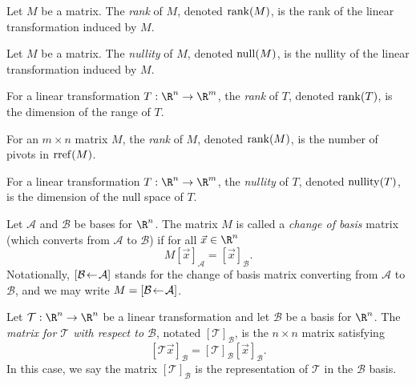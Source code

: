 \begin{SaveDefinition}[key=RankofaMatrix, title={Rank of a Matrix}]
	Let $M$ be a matrix.
	The \emph{rank} of $M$, denoted $\Rank(M)$, is the rank of
	the linear transformation induced by $M$.
\end{SaveDefinition}

\begin{SaveDefinition}[key=NullityofaMatrix, title={Nullity of a Matrix}]
	Let $M$ be a matrix.
	The \emph{nullity} of $M$, denoted $\Null(M)$, is the nullity of
	the linear transformation induced by $M$.
\end{SaveDefinition}

\begin{SaveDefinition}[key=Rank, title={Rank}]
	For a linear transformation $T:\R^n\to \R^m$, the
	\emph{rank} of $T$, denoted $\Rank(T)$, is the dimension of the range of
	$T$.

	For an $m\times n$ matrix $M$, the
	\emph{rank} of $M$, denoted $\Rank(M)$, is the number of pivots in
	$\rref(M)$.
\end{SaveDefinition}

\begin{SaveDefinition}[key=Nullity, title={Nullity}]
	For a linear transformation $T:\R^n\to \R^m$, the
	\emph{nullity} of $T$, denoted $\Nullity(T)$, is the dimension of the null space of
	$T$.
\end{SaveDefinition}

\begin{SaveDefinition}[key=ChangeofBasisMatrix, title={Change of Basis Matrix}]
	Let $\mathcal A$ and $\mathcal B$ be bases for $\R^n$. The matrix $M$ is called
	a \emph{change of basis} matrix (which converts from $\mathcal A$ to $\mathcal B$) if
	for all $\vec x\in \R^n$
	\[
		M[\vec x]_{\mathcal A}=[\vec x]_{\mathcal B}.
	\]
	 Notationally, $\BasisChange{\mathcal A}{\mathcal B}$
	stands for the change of basis matrix converting from $\mathcal A$ to $\mathcal B$,
	and we may write $M=\BasisChange{\mathcal A}{\mathcal B}$.
\end{SaveDefinition}

\begin{SaveDefinition}[key=LinearTransformationinaBasis, title={Linear Transformation in a Basis}]
	Let $\mathcal T:\R^n\to\R^n$ be a linear transformation and let $\mathcal B$ be a
	basis for $\R^n$. The \emph{matrix for $\mathcal T$ with respect to $\mathcal B$}, notated
	$[\mathcal T]_{\mathcal B}$,
	is the $n\times n$ matrix satisfying
	\[
		[\mathcal T\vec x]_{\mathcal B} = [\mathcal T]_{\mathcal B}[\vec x]_{\mathcal B}.
	\]
	In this case, we say the matrix $[\mathcal T]_{\mathcal B}$ is the representation
	of $\mathcal T$ in the $\mathcal B$ basis.
\end{SaveDefinition}


